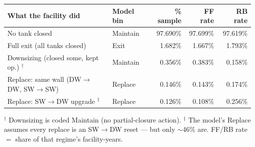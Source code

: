\begin{center}
\small
\renewcommand{\arraystretch}{1.25}
\begin{tabular}{llrrr}
\toprule
\textbf{What the facility did} & \textbf{Model bin} & \textbf{\% sample} & \textbf{FF rate} & \textbf{RB rate} \\
\midrule
No tank closed & Maintain & 97.690\% & 97.699\% & 97.619\% \\
Full exit (all tanks closed) & Exit & 1.682\% & 1.667\% & 1.793\% \\
Downsizing (closed some, kept op.) $^{\dagger}$ & Maintain & 0.356\% & 0.383\% & 0.158\% \\
Replace: same wall (DW$\to$DW, SW$\to$SW) & Replace & 0.146\% & 0.143\% & 0.174\% \\
Replace: SW$\to$DW upgrade $^{\ddagger}$ & Replace & 0.126\% & 0.108\% & 0.256\% \\
\bottomrule
\end{tabular}
\end{center}
\vspace{0.1cm}
{\centering\scriptsize $^{\dagger}$ Downsizing is coded Maintain (no partial-closure action). 
$^{\ddagger}$ The model's Replace assumes every replace is an SW$\to$DW reset --- but only $\sim$46\% are. 
FF/RB rate $=$ share of that regime's facility-years.\par}
